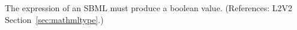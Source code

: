 The  expression of an SBML \Constraint must produce a
boolean value.  (References: L2V2 Section~\ref{sec:mathmltype}.)

